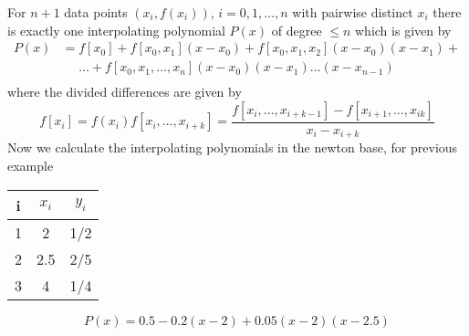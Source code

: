 For $n+1$ data points $(x_i, f(x_i))$, $i = 0,1,\ldots, n$ with pairwise distinct $x_i$ there is exactly one interpolating polynomial $P(x)$
of degree $\leq n$ which is given by
\begin{align*}
    P(x) &= f[x_0]+f[x_0, x_1] (x-x_0) + f[x_0, x_1, x_2] (x-x_0)(x-x_1)+\\
    &\phantom{=}\ldots + f[x_0, x_1, \ldots, x_n] (x-x_0)(x-x_1)\ldots (x-x_{n-1})\\
\end{align*}
where the divided differences are given by
\begin{equation*}
    f[x_i] = f(x_i)
    f[x_i, \ldots, x_{i+k}] = \frac{f[x_i, \ldots, x_{i+k-1}]-f[x_{i+1}, \ldots, x_{ik}]}{x_i - x_{i+k}}
\end{equation*}
Now we calculate the interpolating polynomials in the newton base, for previous example


\begin{center}
    \begin{tabular}{ccc}
        \toprule
        i & $x_i$ & $y_i$ \\
        \midrule
        1 & 2     & 1/2   \\
        2 & 2.5   & 2/5   \\
        3 & 4     & 1/4   \\
        \bottomrule
    \end{tabular}
\end{center}


\begin{center}
\end{center}
\begin{equation*}
    P(x)= 0.5-0.2(x-2)+0.05(x-2)(x-2.5)
\end{equation*}


